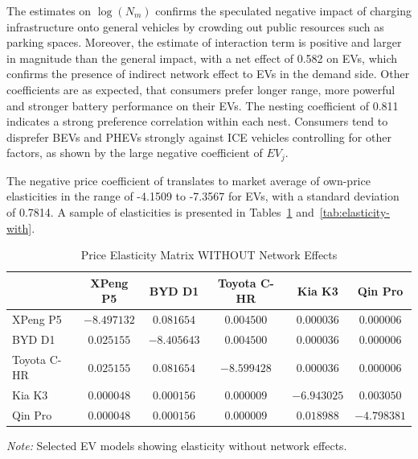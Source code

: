 \documentclass[12pt]{article}
\begin{document}
The estimates on $\log(N_m)$ confirms the speculated negative impact of charging infrastructure onto general vehicles by crowding out public resources such as parking spaces.
Moreover, the estimate of interaction term is positive and larger in magnitude than the general impact, 
with a net effect of 0.582 on EVs, which confirms the presence of indirect network effect to EVs in the demand side.
Other coefficients are as expected, that consumers prefer longer range, more powerful and stronger battery performance on their EVs.
The nesting coefficient of 0.811 indicates a strong preference correlation within each nest.
Consumers tend to disprefer BEVs and PHEVs strongly against ICE vehicles controlling for other factors, as shown by the large negative coefficient of $EV_j$.

The negative price coefficient of translates to market average of own-price elasticities in the range of -4.1509 to -7.3567 for EVs,
with a standard deviation of 0.7814. A sample of elasticities is presented in Tables~\ref{tab:elasticity-without} and~\ref{tab:elasticity-with}.

\begin{table}[!htbp]
\centering
\caption{Price Elasticity Matrix WITHOUT Network Effects}
\label{tab:elasticity-without}
\begin{tabular}{@{}lccccc@{}}
\toprule
& XPeng P5 & BYD D1 & Toyota C-HR & Kia K3 & Qin Pro \\
\midrule
XPeng P5 & $-8.497132$ & $0.081654$ & $0.004500$ & $0.000036$ & $0.000006$ \\
BYD D1 & $0.025155$ & $-8.405643$ & $0.004500$ & $0.000036$ & $0.000006$ \\
Toyota C-HR & $0.025155$ & $0.081654$ & $-8.599428$ & $0.000036$ & $0.000006$ \\
Kia K3 & $0.000048$ & $0.000156$ & $0.000009$ & $-6.943025$ & $0.003050$ \\
Qin Pro & $0.000048$ & $0.000156$ & $0.000009$ & $0.018988$ & $-4.798381$ \\
\bottomrule
\end{tabular}
\footnotesize
\textit{Note:} Selected EV models showing elasticity without network effects.
\end{table}
\end{document}
